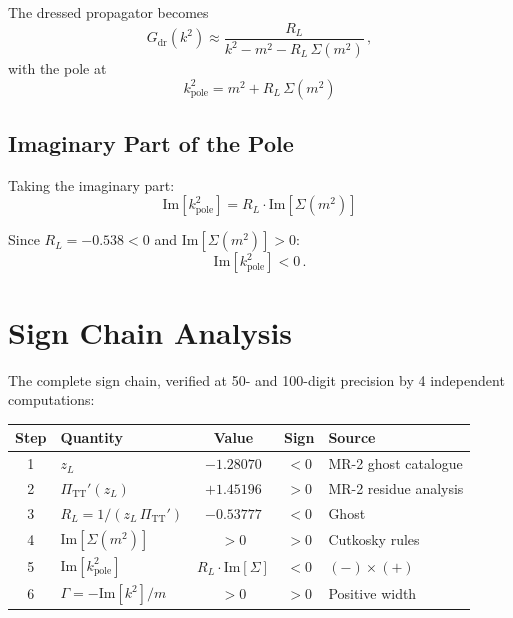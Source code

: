 \documentclass[11pt,a4paper]{article}
\newcommand{\PiTT}{\Pi_{\mathrm{TT}}}
\newcommand{\Imag}{\mathrm{Im}}
\begin{document}
The dressed propagator becomes
\begin{equation}\label{eq:G-near-pole}
  G_{\mathrm{dr}}(k^2)
  \approx \frac{R_L}{k^2 - m^2 - R_L\,\Sigma(m^2)}\,,
\end{equation}
with the pole at
\begin{equation}\label{eq:pole}
  \boxed{
    k^2_{\mathrm{pole}}
    = m^2 + R_L\,\Sigma(m^2)
  }
\end{equation}

\subsection{Imaginary Part of the Pole}

Taking the imaginary part:
\begin{equation}\label{eq:Im-pole}
  \boxed{
    \Imag[k^2_{\mathrm{pole}}]
    = R_L \cdot \Imag[\Sigma(m^2)]
  }
\end{equation}

Since $R_L = -0.538 < 0$ and $\Imag[\Sigma(m^2)] > 0$:
\begin{equation}
  \Imag[k^2_{\mathrm{pole}}] < 0\,.
\end{equation}


\section{Sign Chain Analysis}
\label{sec:sign-chain}

The complete sign chain, verified at 50- and 100-digit precision by
4 independent computations:

\begin{center}
\begin{tabular}{clccl}
\toprule
Step & Quantity & Value & Sign & Source \\
\midrule
1 & $z_L$ & $-1.28070$ & $< 0$ & MR-2 ghost catalogue \\
2 & $\PiTT'(z_L)$ & $+1.45196$ & $> 0$ & MR-2 residue analysis \\
3 & $R_L = 1/(z_L\,\PiTT')$ & $-0.53777$ & $< 0$ & Ghost \\
4 & $\Imag[\Sigma(m^2)]$ & $>0$ & $> 0$ & Cutkosky rules \\
5 & $\Imag[k^2_{\mathrm{pole}}]$ & $R_L\!\cdot\!\Imag[\Sigma]$
    & $< 0$ & $(-){\times}(+)$ \\
6 & $\Gamma = -\Imag[k^2]/m$ & $>0$ & $> 0$ & Positive width \\
\bottomrule
\end{tabular}
\end{center}
\end{document}
